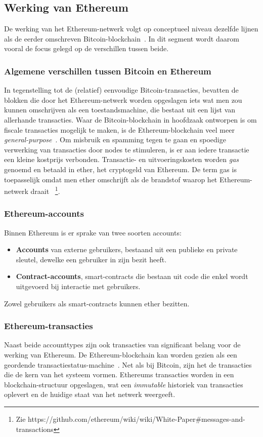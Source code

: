 	\subsection{Werking van Ethereum}
		De werking van het Ethereum-netwerk volgt op conceptueel niveau dezelfde lijnen als de eerder omschreven Bitcoin-blockchain~\autocite{Wood2017}. In dit segment wordt daarom vooral de focus gelegd op de verschillen tussen beide. 
		\subsubsection{Algemene verschillen tussen Bitcoin en Ethereum}
			In tegenstelling tot de (relatief) eenvoudige Bitcoin-transacties, bevatten de blokken die door het Ethereum-netwerk worden opgeslagen iets wat men zou kunnen omschrijven als een toestandsmachine, die bestaat uit een lijst van allerhande transacties. Waar de Bitcoin-blockchain in hoofdzaak ontworpen is om fiscale transacties mogelijk te maken, is de Ethereum-blockchain veel meer \textit{general-purpose}~\autocite{McCorry2017}. Om misbruik en spamming tegen te gaan en spoedige verwerking van transacties door nodes te stimuleren, is er aan iedere transactie een kleine kostprijs verbonden. Transactie- en uitvoeringskosten worden \textit{gas} genoemd en betaald in ether, het cryptogeld van Ethereum. De term gas is toepasselijk omdat men ether omschrijft als de brandstof waarop het Ethereum-netwerk draait ~\autocite{Buterin2014}\footnote{Zie https://github.com/ethereum/wiki/wiki/White-Paper\#messages-and-transactions}.
		\subsubsection{Ethereum-accounts}
		Binnen Ethereum is er sprake van twee soorten accounts: 
		\begin{itemize}
			\item \textbf{Accounts} van externe gebruikers, bestaand uit een publieke en private sleutel, dewelke een gebruiker in zijn bezit heeft.
			\item \textbf{Contract-accounts}, smart-contracts die bestaan uit code die enkel wordt uitgevoerd bij interactie met gebruikers.
		\end{itemize}	
		Zowel gebruikers als smart-contracts kunnen ether bezitten. ~\autocite{McCorry2017}
		\subsubsection{Ethereum-transacties}
			Naast beide accounttypes zijn ook transacties van significant belang voor de werking van Ethereum. De Ethereum-blockchain kan worden gezien als een geordende transactiestatus-machine~\autocite{McCorry2017}. Net als bij Bitcoin, zijn het de transacties die de kern van het systeem vormen. Ethereums transacties worden in een blockchain-structuur opgeslagen, wat een \textit{immutable} historiek van transacties oplevert en de huidige staat van het netwerk weergeeft. ~\autocite{Buterin2014}

